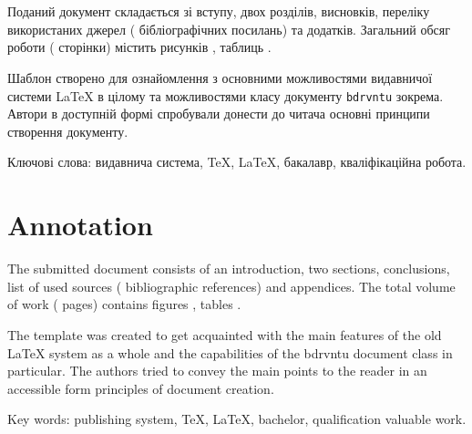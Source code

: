 \frontmatter
\chapter*{\abstractname}%
\thispagestyle{empty}

Поданий документ складається зі вступу, двох розділів, висновків, переліку використаних джерел
( бібліографічних посилань) та додатків. Загальний обсяг роботи ( сторінки) містить
рисунків , таблиць .

Шаблон створено для ознайомлення з основними можливостями видавничої системи {\LaTeX} в цілому та можливостями 
класу документу \verb|bdrvntu| зокрема. Автори в доступній формі спробували донести до читача основні принципи
створення документу.

Ключові слова: видавнича система, {\TeX}, {\LaTeX}, бакалавр, кваліфікаційна робота.

\chapter*{Annotation}
\thispagestyle{empty}

The submitted document consists of an introduction, two sections, conclusions,
list of used sources ( bibliographic references) and appendices.
The total volume of work ( pages) contains figures , tables .

The template was created to get acquainted with the main features of
the old {\LaTeX} system as a whole and the capabilities of the bdrvntu document class
in particular. The authors tried to convey the main points to the reader in an accessible form
principles of document creation.

Key words: publishing system, {\TeX}, {\LaTeX}, bachelor, qualification
valuable work.

\newpage
\mainmatter